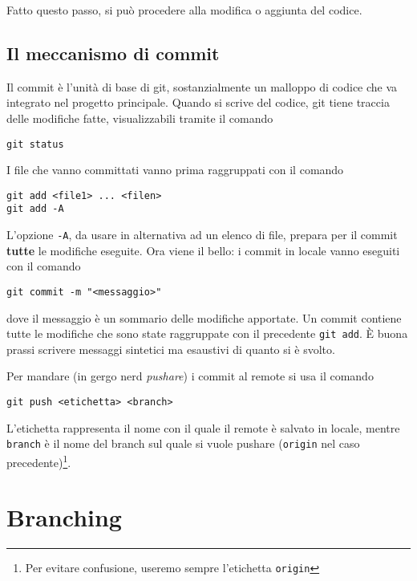 \documentclass[a4paper, 11pt]{article}
\begin{document}
	Fatto questo passo, si può procedere alla modifica o aggiunta del codice.
	
	\subsection{Il meccanismo di commit}
	Il commit è l'unità di base di git, sostanzialmente un malloppo di codice che va integrato nel progetto principale. Quando si scrive del codice, git tiene traccia delle modifiche fatte, visualizzabili tramite il comando \begin{lstlisting}
git status
	\end{lstlisting}
	I file che vanno committati vanno prima raggruppati con il comando \begin{lstlisting}
git add <file1> ... <filen>
git add -A
	\end{lstlisting}
	
	L'opzione \lstinline|-A|, da usare in alternativa ad un elenco di file, prepara per il commit \textbf{tutte} le modifiche eseguite.
	Ora viene il bello: i commit in locale vanno eseguiti con il comando \begin{lstlisting}
git commit -m "<messaggio>"
	\end{lstlisting}
	dove il messaggio è un sommario delle modifiche apportate. Un commit contiene tutte le modifiche che sono state raggruppate con il precedente \lstinline|git add|. È buona prassi scrivere messaggi sintetici ma esaustivi di quanto si è svolto.
	
	Per mandare (in gergo nerd \emph{pushare}) i commit al remote si usa il comando \begin{lstlisting}
git push <etichetta> <branch>
	\end{lstlisting}
	L'etichetta rappresenta il nome con il quale il remote è salvato in locale, mentre \lstinline|branch| è il nome del branch sul quale si vuole pushare (\lstinline|origin| nel caso precedente)\footnote{Per evitare confusione, useremo sempre l'etichetta \lstinline|origin|}.
	
	\section{Branching}
\end{document}
